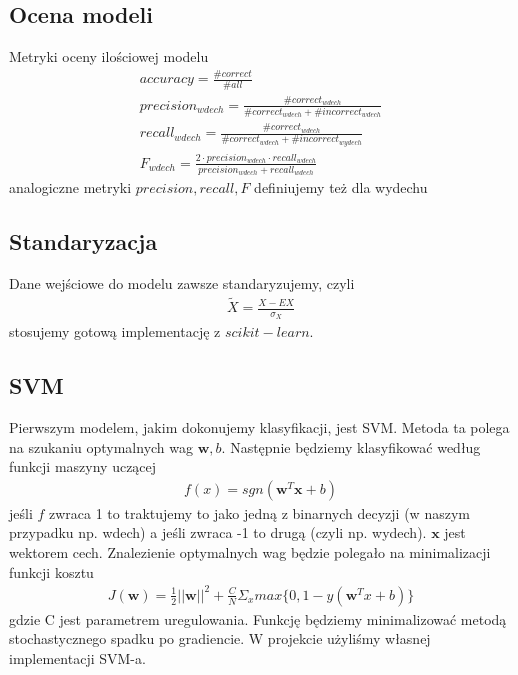 \documentclass[polish]{article}
\begin{document}
\subsection{Ocena modeli}
Metryki oceny ilościowej modelu
\begin{gather*}
	accuracy = \frac{\# correct}{\# all} \\
	precision_{wdech} = \frac{\# correct_{wdech}}{\# correct_{wdech} + \# incorrect_{wdech}} \\
	recall_{wdech} = \frac{\# correct_{wdech}}{\# correct_{wdech} + \# incorrect_{wydech}} \\
	F_{wdech} = \frac{2 \cdot precision_{wdech} \cdot recall_{wdech}}{precision_{wdech} + recall_{wdech}}
\end{gather*}
analogiczne metryki $precision, recall, F$ definiujemy też dla wydechu
\subsection{Standaryzacja}
Dane wejściowe do modelu zawsze standaryzujemy, czyli
\begin{gather*}
	\tilde X = \frac{X - EX}{\sigma_X}
\end{gather*}
stosujemy gotową implementację z $scikit-learn$.
\subsection{SVM}
Pierwszym modelem, jakim dokonujemy klasyfikacji, jest SVM. Metoda ta polega na szukaniu optymalnych wag $\boldsymbol{w}, b$.
Następnie będziemy klasyfikować według funkcji maszyny uczącej 
\begin{gather*}
	f(x) = sgn(\boldsymbol{w}^T \boldsymbol{x} + b)
\end{gather*}
jeśli $f$ zwraca 1 to traktujemy to jako jedną z binarnych decyzji (w naszym przypadku np. wdech) a jeśli zwraca -1 to drugą (czyli np. wydech).
$\textbf{x}$ jest wektorem cech.  Znalezienie optymalnych wag będzie polegało na minimalizacji
funkcji kosztu
\begin{gather*}
	J(\boldsymbol{w}) = \frac{1}{2}||\boldsymbol{w}||^2 + \frac{C}{N}\Sigma_x max\{0, 1 - y(\boldsymbol{w}^Tx + b)\}
\end{gather*}
gdzie C jest parametrem uregulowania. Funkcję będziemy minimalizować metodą stochastycznego spadku po gradiencie.
W projekcie użyliśmy własnej implementacji SVM-a.
\end{document}
